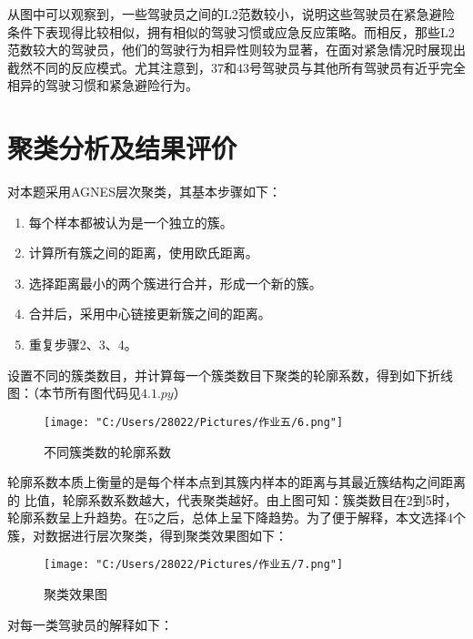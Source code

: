 \documentclass[withoutpreface,bwprint]{cumcmthesis}
\begin{document}
    从图中可以观察到，一些驾驶员之间的L2范数较小，说明这些驾驶员在紧急避险条件下表现得比较相似，拥有相似的驾驶习惯或应急反应策略。而相反，那些L2范数较大的驾驶员，他们的驾驶行为相异性则较为显著，在面对紧急情况时展现出截然不同的反应模式。尤其注意到，37和43号驾驶员与其他所有驾驶员有近乎完全相异的驾驶习惯和紧急避险行为。

    \section{聚类分析及结果评价}
    对本题采用AGNES层次聚类，其基本步骤如下：\par
    \begin{enumerate}
        \item 每个样本都被认为是一个独立的簇。
        \item 计算所有簇之间的距离，使用欧氏距离。
        \item 选择距离最小的两个簇进行合并，形成一个新的簇。
        \item 合并后，采用中心链接更新簇之间的距离。
        \item 重复步骤2、3、4。
    \end{enumerate}\par
    设置不同的簇类数目，并计算每一个簇类数目下聚类的轮廓系数，得到如下折线图：（本节所有图代码见$4.1.py$）\par
    \begin{figure}[!htbp] 
        \centering
        \texttt{[image: "C:/Users/28022/Pictures/作业五/6.png"]} 
        \caption{不同簇类数的轮廓系数} 
        \label{fig:example} 
    \end{figure}
    轮廓系数本质上衡量的是每个样本点到其簇内样本的距离与其最近簇结构之间距离的
    比值，轮廓系数系数越大，代表聚类越好。由上图可知：簇类数目在2到5时，轮廓系数呈上升趋势。在5之后，总体上呈下降趋势。为了便于解释，本文选择4个簇，对数据进行层次聚类，得到聚类效果图如下：\par
    \begin{figure}[!htbp] 
        \centering
        \texttt{[image: "C:/Users/28022/Pictures/作业五/7.png"]} 
        \caption{聚类效果图} 
        \label{fig:example} 
    \end{figure}
    对每一类驾驶员的解释如下：
\end{document}
